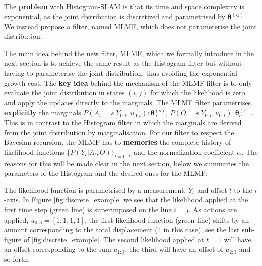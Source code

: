The \textbf{problem} with Histogram-SLAM is that its time and space complexity is exponential, as the joint distribution is discretized and 
parametrised by $\boldsymbol{\theta}^{(ij)}$. We instead propose a filter, named MLMF, which does not parameterise the joint distribution.

The main idea behind the new filter, MLMF, which we formally introduce in the next section is to achieve the same result as 
the Histogram filter but without having to parameterise the joint distribution, thus avoiding the exponential growth cost. 
The \textbf{key idea} behind the mechanism of the MLMF filter is to only evaluate the joint distribution in states $(i,j)$ for which the likelihood 
is zero and apply the updates directly to the marginals. The MLMF filter parametrises \textbf{explicitly} the marginals 
$P(A_t=s|Y_{0:t},u_{0:t}): \boldsymbol{\theta}_a^{(s)}$, $P(O=s|Y_{0:t},u_{0:t}): \boldsymbol{\theta}_o^{(s)}$. This is in contrast to the Histogram filter in which the marginals are  
derived from the joint distribution by marginalisation. For our filter to respect the Bayesian recursion, the MLMF has to \textbf{memories}
the complete history of likelihood functions $\{P(Y_t|A_t,O)\}_{t=0:T}$ and the normalization coefficient $\alpha$. The reasons 
for this will be made clear in the next section, below we summaries the parameters of the Histogram and the desired ones for the MLMF:

\begin{center}
\begin{minipage}{0.55\textwidth}
\end{minipage}
\end{center}

The likelihood function is parametrised by a measurement, $Y_t$ and offset $l$ to the $i$-axis. In Figure \ref{fig:discrete_example} we see that
the likelihood applied at the first time step (green line) is superimposed on the line $i=j$. As actions are applied, $u_{0:3}=[1,1,1,1]$, 
the first likelihood function (green line) shifts by an amount corresponding to the total displacement (4 in this case), see the last sub-figure of
\ref{fig:discrete_example}. The second likelihood applied at $t=1$ will have an offset corresponding to the sum $u_{1:3}$, the third will have 
an offset of $u_{2:3}$ and so forth.

